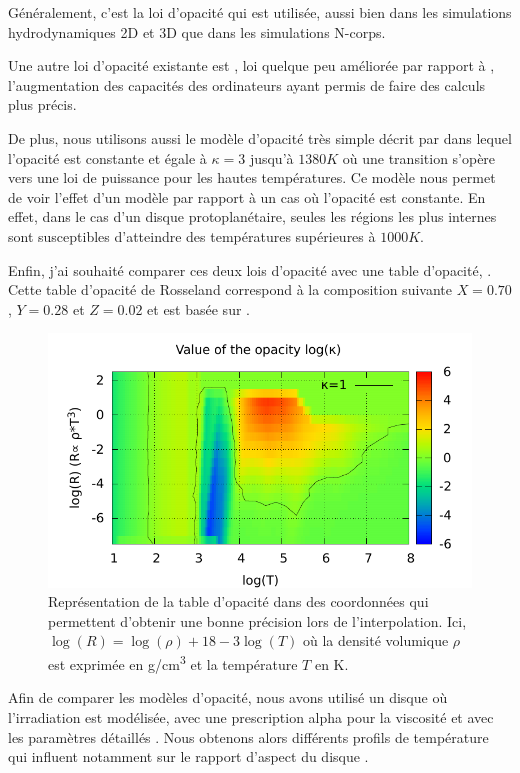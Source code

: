 Généralement, c'est la loi d'opacité \cite{bell1994FU} qui est utilisée, aussi bien dans les simulations hydrodynamiques 2D et
3D que dans les simulations N-corps. 

Une autre loi d'opacité existante est \cite{zhu2009nonsteady}, loi quelque peu améliorée par rapport à \cite{bell1994FU},
l'augmentation des capacités des ordinateurs ayant permis de faire des calculs plus précis. 

De plus, nous utilisons aussi le modèle d'opacité très simple décrit par \cite{chambers2009analytic} dans lequel l'opacité est
constante et égale à $\kappa=3$ jusqu'à $1380\unit{K}$ où une transition s'opère vers une loi de puissance pour les hautes températures. Ce modèle nous
permet de voir l'effet d'un modèle par rapport à un cas où l'opacité est constante. En effet, dans le cas d'un disque
protoplanétaire, seules les régions les plus internes sont susceptibles d'atteindre des températures supérieures à
$1000\unit{K}$. 

Enfin, j'ai souhaité comparer ces deux lois d'opacité avec une table d'opacité, \cite{hure2000transition} . Cette table
d'opacité de Rosseland correspond à la composition suivante $X=0.70$, $Y=0.28$ et $Z=0.02$ et est basée sur
\cite{seaton1994opacities, alexander1994low, henning1996dust}.

\begin{figure}[htb]
\centering
\includegraphics[width=0.65\linewidth]{figure/hure_opacity_table.pdf}
\caption{Représentation de la table d'opacité \cite{hure2000transition} dans des coordonnées qui permettent d'obtenir une bonne précision lors de l'interpolation. Ici, $\log(R)=\log(\rho) + 18 -3\log(T)$ où la densité volumique $\rho$ est exprimée en \unit{g/cm^3} et la température $T$ en K.}\label{fig:hure_profile}
\end{figure}

Afin de comparer les modèles d'opacité, nous avons utilisé un disque où l'irradiation est modélisée, avec une prescription alpha pour la viscosité et avec les paramètres détaillés . Nous obtenons alors différents profils de température qui influent notamment sur le rapport d'aspect du disque . 

